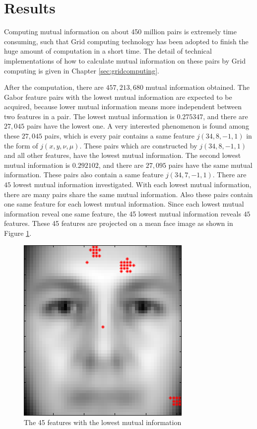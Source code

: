 \section{Results}
Computing mutual information on about 450 million pairs is extremely time consuming, such that Grid computing technology has been adopted to finish the huge amount of computation in a short time. The detail of technical implementations of how to calculate mutual information on these pairs by Grid computing is given in \mbox{Chapter} \ref{sec:gridcomputing}.

After the computation, there are $457,213,680$ mutual information obtained. The Gabor feature pairs with the lowest mutual information are expected to be acquired, because lower mutual information means more independent between two features in a pair. The lowest mutual information is $0.275347$, and there are $27,045$ pairs have the lowest one. A very interested phenomenon is found among these $27,045$ pairs, which is every pair contains a same feature $j(34,8, -1, 1)$ in the form of $j(x,y,\nu,\mu)$. These pairs which are constructed by $j(34,8, -1, 1)$ and all other features, have the lowest mutual information. The second lowest mutual information is $0.292102$, and there are $27,095$ pairs have the same mutual information. These pairs also contain a same feature $j(34,7, -1, 1)$. There are $45$ lowest mutual information investigated. With each lowest mutual information, there are many pairs share the same mutual information. Also these pairs contain one same feature for each lowest mutual information. Since each lowest mutual information reveal one same feature, the 45 lowest mutual information reveals $45$ features. These 45 features are projected on a mean face image as shown in \mbox{Figure} \ref{fig:mutinffeatures}.
\begin{figure}[ht]
 \begin{center}
  \includegraphics[scale=0.25]{ch5/figures/XM2VTS_mutinf.png}
  \caption{The 45 features with the lowest mutual information}
  \label{fig:mutinffeatures}
 \end{center}
\end{figure} 
